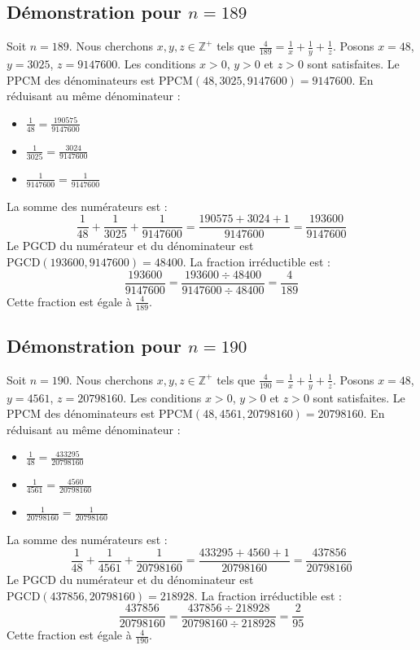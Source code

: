 \documentclass[11pt,a4paper]{article}
\begin{document}
\subsection{Démonstration pour $n = 189$}
Soit $n = 189$. Nous cherchons $x, y, z \in \mathbb{Z}^{+}$ tels que $\frac{4}{189} = \frac{1}{x} + \frac{1}{y} + \frac{1}{z}$.
Posons $x = 48$, $y = 3025$, $z = 9147600$.
Les conditions $x > 0$, $y > 0$ et $z > 0$ sont satisfaites.
Le PPCM des dénominateurs est $\text{PPCM}(48, 3025, 9147600) = 9147600$.
En réduisant au même dénominateur :
\begin{itemize}
    \item $\frac{1}{48} = \frac{190575}{9147600}$
    \item $\frac{1}{3025} = \frac{3024}{9147600}$
    \item $\frac{1}{9147600} = \frac{1}{9147600}$
\end{itemize}
La somme des numérateurs est :
$$ \frac{1}{48} + \frac{1}{3025} + \frac{1}{9147600} = \frac{190575 + 3024 + 1}{9147600} = \frac{193600}{9147600} $$
Le PGCD du numérateur et du dénominateur est $\text{PGCD}(193600, 9147600) = 48400$.
La fraction irréductible est :
$$ \frac{193600}{9147600} = \frac{193600 \div 48400}{9147600 \div 48400} = \frac{4}{189} $$
Cette fraction est égale à $\frac{4}{189}$.

\subsection{Démonstration pour $n = 190$}
Soit $n = 190$. Nous cherchons $x, y, z \in \mathbb{Z}^{+}$ tels que $\frac{4}{190} = \frac{1}{x} + \frac{1}{y} + \frac{1}{z}$.
Posons $x = 48$, $y = 4561$, $z = 20798160$.
Les conditions $x > 0$, $y > 0$ et $z > 0$ sont satisfaites.
Le PPCM des dénominateurs est $\text{PPCM}(48, 4561, 20798160) = 20798160$.
En réduisant au même dénominateur :
\begin{itemize}
    \item $\frac{1}{48} = \frac{433295}{20798160}$
    \item $\frac{1}{4561} = \frac{4560}{20798160}$
    \item $\frac{1}{20798160} = \frac{1}{20798160}$
\end{itemize}
La somme des numérateurs est :
$$ \frac{1}{48} + \frac{1}{4561} + \frac{1}{20798160} = \frac{433295 + 4560 + 1}{20798160} = \frac{437856}{20798160} $$
Le PGCD du numérateur et du dénominateur est $\text{PGCD}(437856, 20798160) = 218928$.
La fraction irréductible est :
$$ \frac{437856}{20798160} = \frac{437856 \div 218928}{20798160 \div 218928} = \frac{2}{95} $$
Cette fraction est égale à $\frac{4}{190}$.
\end{document}
